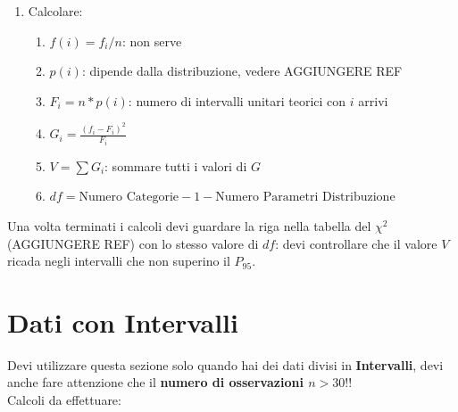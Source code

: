 \begin{enumerate}
\begin{itemize}
\begin{figure}[H]
                    \end{figure}
          \end{itemize}
    \item Calcolare:
          \begin{enumerate}
              \item $f(i) = f_i / n$: non serve %
              \item $p(i)$: dipende dalla distribuzione, vedere AGGIUNGERE REF
              \item $F_i = n * p(i)$: numero di intervalli unitari teorici con
                    $i$ arrivi
              \item $G_i = \frac{(f_i - F_i)^2}{F_i}$
              \item $V = \sum G_i$: sommare tutti i valori di $G$
              \item $df = \text{Numero Categorie} - 1 - \text{Numero Parametri
                            Distribuzione}$
          \end{enumerate}
\end{enumerate}

Una volta terminati i calcoli devi guardare la riga nella tabella del $\chi^2$
(AGGIUNGERE REF) con lo stesso valore di $df$: devi controllare che il valore
$V$ ricada negli intervalli che non superino il $P_{95}$.

\section{Dati con Intervalli}

Devi utilizzare questa sezione solo quando hai dei dati
divisi in \textbf{Intervalli},
devi anche fare attenzione che il \textbf{numero di osservazioni $n > 30$}!!\\

Calcoli da effettuare:

